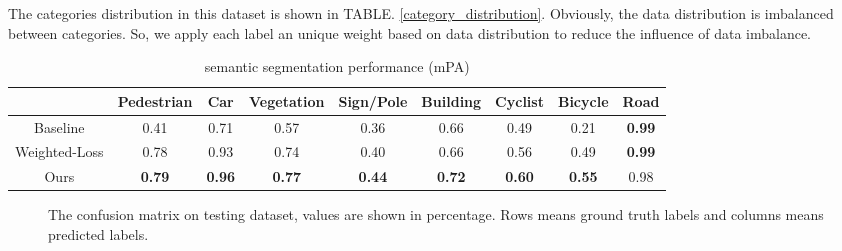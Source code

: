 The categories distribution in this dataset is shown in TABLE. \ref{category_distribution}. Obviously, the data distribution is imbalanced between categories. So, we apply each label an unique weight based on data distribution to reduce the influence of data imbalance.

\begin{table}
	\caption{semantic segmentation performance (mPA)}
	\label{performance}
	\centering
	\small
	\renewcommand{\arraystretch}{1.5}
	\begin{tabular}{|c|c|c|c|c|c|c|c|c|}
		\hline
		\diagbox{Model}{Label} & Pedestrian & Car & Vegetation & Sign/Pole & Building & Cyclist & Bicycle & Road	\\
		\hline
		Baseline & 0.41 & 0.71 & 0.57 & 0.36 & 0.66 & 0.49 & 0.21 & \textbf{0.99}	\\
		\hline
		Weighted-Loss& 0.78 & 0.93 & 0.74 & 0.40 & 0.66 & 0.56 & 0.49 & \textbf{0.99}	\\
		\hline
		Ours & \textbf{0.79} & \textbf{0.96} & \textbf{0.77} & \textbf{0.44} & \textbf{0.72} & \textbf{0.60} & \textbf{0.55} & 0.98	\\
		\hline
	\end{tabular}
\end{table}

\begin{figure} 
	\centering
	\caption{
		The confusion matrix on testing dataset, values are shown in percentage.
		Rows means ground truth labels and columns means predicted labels.
	}
	\label{fig:matrix}
\end{figure}

